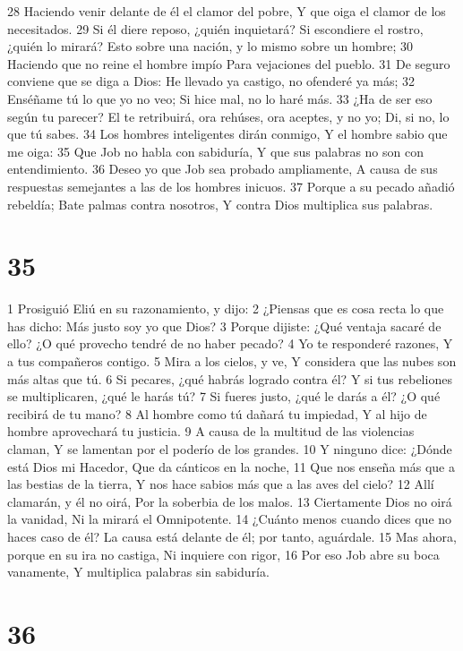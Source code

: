 28 Haciendo venir delante de él el clamor del pobre,
Y que oiga el clamor de los necesitados.
29 Si él diere reposo, ¿quién inquietará?
Si escondiere el rostro, ¿quién lo mirará?
Esto sobre una nación, y lo mismo sobre un hombre;
30 Haciendo que no reine el hombre impío
Para vejaciones del pueblo.
31 De seguro conviene que se diga a Dios:
He llevado ya castigo, no ofenderé ya más;
32 Enséñame tú lo que yo no veo;
Si hice mal, no lo haré más.
33 ¿Ha de ser eso según tu parecer?
El te retribuirá, ora rehúses, ora aceptes, y no yo;
Di, si no, lo que tú sabes.
34 Los hombres inteligentes dirán conmigo,
Y el hombre sabio que me oiga: 
35 Que Job no habla con sabiduría,
Y que sus palabras no son con entendimiento.
36 Deseo yo que Job sea probado ampliamente,
A causa de sus respuestas semejantes a las de los hombres inicuos.
37 Porque a su pecado añadió rebeldía;
Bate palmas contra nosotros,
Y contra Dios multiplica sus palabras.

\chapter{35}

1 Prosiguió Eliú en su razonamiento, y dijo:
2 ¿Piensas que es cosa recta lo que has dicho:
Más justo soy yo que Dios?
3 Porque dijiste: ¿Qué ventaja sacaré de ello?
¿O qué provecho tendré de no haber pecado?
4 Yo te responderé razones, 
Y a tus compañeros contigo.
5 Mira a los cielos, y ve, 
Y considera que las nubes son más altas que tú. 
6 Si pecares, ¿qué habrás logrado contra él?
Y si tus rebeliones se multiplicaren, ¿qué le harás tú?
7 Si fueres justo, ¿qué le darás a él?
¿O qué recibirá de tu mano?
8 Al hombre como tú dañará tu impiedad,
Y al hijo de hombre aprovechará tu justicia. 
9 A causa de la multitud de las violencias claman,
Y se lamentan por el poderío de los grandes.
10 Y ninguno dice: ¿Dónde está Dios mi Hacedor,
Que da cánticos en la noche,
11 Que nos enseña más que a las bestias de la tierra,
Y nos hace sabios más que a las aves del cielo?
12 Allí clamarán, y él no oirá,
Por la soberbia de los malos.
13 Ciertamente Dios no oirá la vanidad,
Ni la mirará el Omnipotente.
14 ¿Cuánto menos cuando dices que no haces caso de él?
La causa está delante de él; por tanto, aguárdale.
15 Mas ahora, porque en su ira no castiga,
Ni inquiere con rigor,
16 Por eso Job abre su boca vanamente,
Y multiplica palabras sin sabiduría.

\chapter{36}

